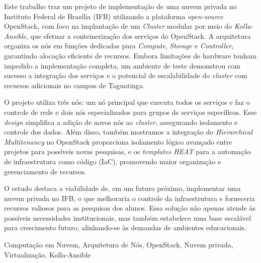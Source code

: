 
Este trabalho traz um projeto de implementação de uma nuvem privada no Instituto Federal de Brasília (IFB) utilizando a plataforma \textit{open-source} OpenStack, com foco na implantação de um \textit{Cluster} modular por meio do \textit{Kolla-Ansible}, que efetuar a conteinerização dos serviços do OpenStack. A arquitetura organiza os nós em funções dedicadas para \textit{Compute}, \textit{Storage} e \textit{Controller}, garantindo alocação eficiente de recursos. Embora limitações de hardware tenham impedido a implementação completa, um ambiente de teste demonstrou com sucesso a integração dos serviços e o potencial de escalabilidade do \textit{cluster} com recursos adicionais no campus de Taguatinga.
    
O projeto utiliza três nós: um nó principal que executa todos os serviços e faz o controle de rede e dois nós especializados para grupos de serviços específicos. Esse \textit{design} simplifica a adição de novos nós ao \textit{cluster}, assegurando isolamento e controle dos dados. Além disso, também mostramos a integração do \textit{Hierarchical Multitenancy} no OpenStack proporciona isolamento lógico avançado entre projetos para possíveis novas pesquisas, e os \textit{templates HEAT} para a automação de infraestrutura como código (IaC), promovendo maior organização e gerenciamento de recursos.
    
O estudo destaca a viabilidade de, em um futuro próximo, implementar uma nuvem privada no IFB, o que melhoraria o controle da infraestrutura e forneceria recursos valiosos para as pesquisas dos alunos. Essa solução não apenas atende às possíveis necessidades institucionais, mas também estabelece uma base escalável para crescimento futuro, alinhando-se às demandas de ambientes educacionais.
 

\begin{keywords}
Computação em Nuvem, Arquitetura de Nós, OpenStack, Nuvem privada, Virtualização, Kolla-Ansible
\end{keywords}